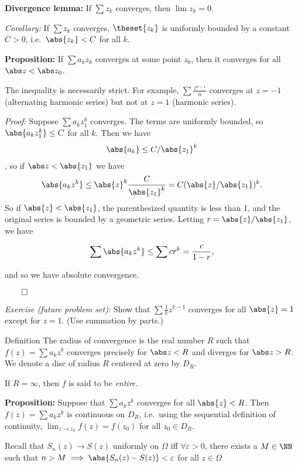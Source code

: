 \textbf{Divergence lemma:} If \(\sum z_k\) converges, then
\(\lim z_k = 0\).

\emph{Corollary:} If \(\sum z_k\) converges, \(\theset{z_k}\) is
uniformly bounded by a constant \(C > 0\), i.e.~\(\abs{z_k} < C\) for
all \(k\).

\textbf{Proposition:} If \(\sum a_k z_k\) converges at some point
\(z_0\), then it converges for all \(\abs z < \abs z_0\).

The inequality is necessarily strict. For example,
\(\sum \frac{z^{n-1}}{n}\) converges at \(z=-1\) (alternating harmonic
series) but not at \(z=1\) (harmonic series).

\emph{Proof:} Suppose \(\sum a_k z_1^k\) converges. The terms are
uniformly bounded, so \(\abs{a_k z_1^k} \leq C\) for all \(k\). Then we
have
\begin{align*}\abs {a_k} \leq C/\abs{z_1}^k\end{align*}, so if
\(\abs z < \abs{z_1}\) we have
\begin{align*}\abs{a_k z^k} \leq \abs{z}^k \frac{C}{\abs{z_1}^k} = C (\abs{z} / \abs{z_1} )^k.\end{align*}
So if \(\abs{z} < \abs{z_1}\), the parenthesized quantity is less than
1, and the original series is bounded by a geometric series. Letting
\(r = \abs{z} / \abs{z_1}\), we have

\begin{align*}
\sum \abs{a_k z^k} \leq \sum c r^k = \frac{c}{1-r}
,\end{align*}

and so we have absolute convergence.

\(\qed\)

\emph{Exercise (future problem set):} Show that
\(\sum \frac 1 k z^{k-1}\) converges for all \(\abs{z} = 1\) except for
\(z = 1\). (Use summation by parts.)

Definition The radius of convergence is the real number \(R\) such that
\(f(z) = \sum a_k z^k\) converges precisely for \(\abs z < R\) and
diverges for \(\abs z > R\). We denote a disc of radius \(R\) centered
at zero by \(D_R\).

If \(R=\infty\), then \(f\) is said to be \emph{entire}.

\textbf{Proposition:} Suppose that \(\sum a_k z^k\) converges for all
\(\abs{z} < R\). Then \(f(z) = \sum a_k z^k\) is continuous on \(D_R\),
i.e.~using the sequential definition of continuity,
\(\lim_{z\to z_0} f(z) = f(z_0)\) for all \(z_0 \in D_R\).

Recall that \(S_n(z) \to S(z)\) uniformly on \(\Omega\) iff
\(\forall \varepsilon > 0\), there exists a \(M\in \NN\) such that
\(n> M \implies \abs{S_n(z) - S(z)} < \varepsilon\) for all
\(z\in \Omega\)

